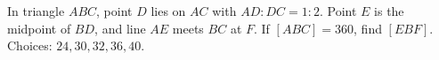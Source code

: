 In triangle $ABC$, point $D$ lies on $AC$ with $AD:DC=1:2$. Point $E$ is the midpoint of $BD$, and line $AE$ meets $BC$ at $F$. If $[ABC]=360$, find $[EBF]$. Choices: $24,30,32,36,40$.

